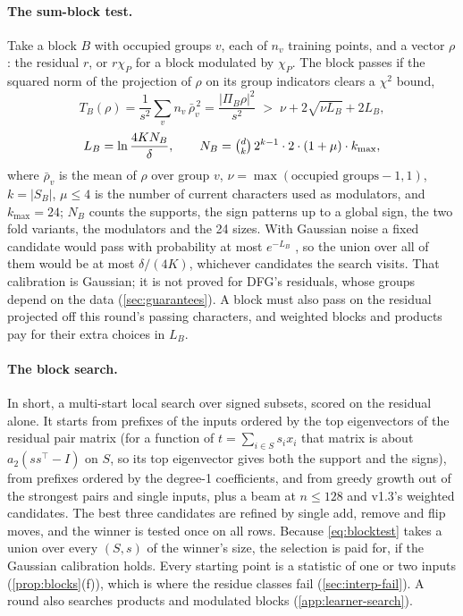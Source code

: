\paragraph{The sum-block test.} Take a block $B$ with occupied groups $v$, each of $n_v$ training points, and a vector $\rho$: the residual $r$, or $r\chi_P$ for a block modulated by $\chi_P$. The block passes if the squared norm of the projection of $\rho$ on its group indicators clears a $\chi^2$ bound,
\begin{equation}\label{eq:blocktest}
T_B(\rho)=\frac1{s^2}\sum_vn_v\,\bar\rho_v^{\,2}=\frac{|\Pi_B\rho|^2}{s^2}\;>\;\nu+2\sqrt{\nu L_B}+2L_B,
\end{equation}
\[
L_B=\ln\frac{4KN_B}\delta,\qquad N_B=\tbinom dk\,2^{k-1}\cdot2\cdot(1+\mu)\cdot k_{\max},
\]
where $\bar\rho_v$ is the mean of $\rho$ over group $v$, $\nu=\max(\text{occupied groups}-1,1)$, $k=|S_B|$, $\mu\le4$ is the number of current characters used as modulators, and $k_{\max}=24$; $N_B$ counts the supports, the sign patterns up to a global sign, the two fold variants, the modulators and the 24 sizes. With Gaussian noise a fixed candidate would pass with probability at most $e^{-L_B}$ \cite{laurent2000adaptive}, so the union over all of them would be at most $\delta/(4K)$, whichever candidates the search visits. That calibration is Gaussian; it is not proved for DFG's residuals, whose groups depend on the data (\cref{sec:guarantees}). A block must also pass on the residual projected off this round's passing characters, and weighted blocks and products pay for their extra choices in $L_B$.

\paragraph{The block search.} In short, a multi-start local search over signed subsets, scored on the residual alone. It starts from prefixes of the inputs ordered by the top eigenvectors of the residual pair matrix (for a function of $t=\sum_{i\in S}s_ix_i$ that matrix is about $a_2(ss^\top-I)$ on $S$, so its top eigenvector gives both the support and the signs), from prefixes ordered by the degree-1 coefficients, and from greedy growth out of the strongest pairs and single inputs, plus a beam at $n\le128$ and v1.3's weighted candidates. The best three candidates are refined by single add, remove and flip moves, and the winner is tested once on all rows. Because \cref{eq:blocktest} takes a union over every $(S,s)$ of the winner's size, the selection is paid for, if the Gaussian calibration holds. Every starting point is a statistic of one or two inputs (\cref{prop:blocks}(f)), which is where the residue classes fail (\cref{sec:interp-fail}). A round also searches products and modulated blocks (\cref{app:learner-search}).

